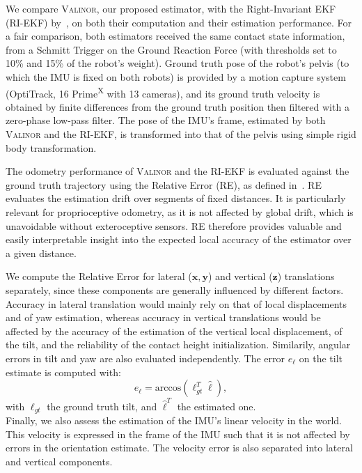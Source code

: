 \documentclass{IJCAS}
\begin{document}
\noindent We compare {\scshape Valinor}, our proposed estimator, with the Right-Invariant EKF (RI-EKF) by~\cite{Hartley2020RIEKF}, on both their computation and their estimation performance. For a fair comparison, both estimators received the same contact state information, from a Schmitt Trigger on the Ground Reaction Force (with thresholds set to 10\% and 15\% of the robot's weight).
Ground truth pose of the robot's pelvis (to which the IMU is fixed on both robots) is provided by a motion capture system (OptiTrack, 16 Prime\textsuperscript{X} with 13 cameras), and its ground truth velocity is obtained by finite differences from the ground truth position then filtered with a zero-phase low-pass filter. The pose of the IMU's frame, estimated by both {\scshape Valinor} and the RI-EKF, is transformed into that of the pelvis using simple rigid body transformation.

The odometry performance of {\scshape Valinor} and the RI-EKF is evaluated against the ground truth trajectory using the Relative Error (RE), as defined in~\cite{Zhang2018QuantitativeTrajectoryEvaluation}. RE evaluates the estimation drift over segments of fixed distances. It is particularly relevant for proprioceptive odometry, as it is not affected by global drift, which is unavoidable without exteroceptive sensors. RE therefore provides valuable and easily interpretable insight into the expected local accuracy of the estimator over a given distance.

We compute the Relative Error for lateral ($\boldsymbol{x}, \boldsymbol{y}$) and vertical ($\boldsymbol{z}$) translations separately, since these components are generally influenced by different factors. Accuracy in lateral translation would mainly rely on that of local displacements and of yaw estimation, whereas accuracy in vertical translations would be affected by the accuracy of the estimation of the vertical local displacement, of the tilt, and the reliability of the contact height initialization. Similarily, angular errors in tilt and yaw are also evaluated independently.
The error $e_{\boldsymbol{\ell}}$ on the tilt estimate is computed with:
\begin{equation}
    e_{\boldsymbol{\ell}} = \text{arccos}\left(\boldsymbol{\ell}_{gt}^{T} \hat{\boldsymbol{\ell}} \right),
\end{equation}
with $\boldsymbol{\ell}_{gt}$ the ground truth tilt, and $\hat{\boldsymbol{\ell}}^{T}$ the estimated one.\\
Finally, we also assess the estimation of the IMU's linear velocity in the world. This velocity is expressed in the frame of the IMU such that it is not affected by errors in the orientation estimate. The velocity error is also separated into lateral and vertical components.
\end{document}
